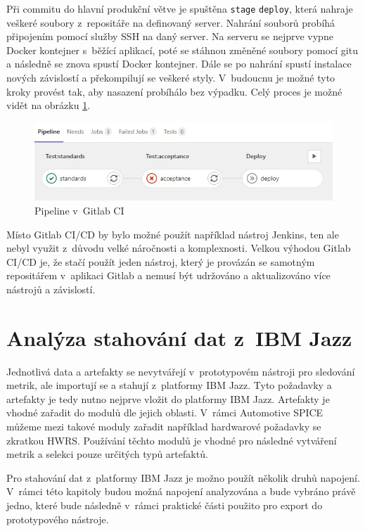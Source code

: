 \documentclass[czech,master]{diploma}
\begin{document}
Při commitu do hlavní produkční větve je spuštěna \texttt{stage} \texttt{deploy}, která nahraje veškeré soubory z~repositáře na definovaný server. Nahrání souborů probíhá připojením pomocí služby SSH na daný server. Na serveru se nejprve vypne Docker kontejner s~běžící aplikací, poté se stáhnou změněné soubory pomocí gitu a následně se znova spustí Docker kontejner. Dále se po nahrání spustí instalace nových závislostí a překompilují se veškeré styly. V~budoucnu je možné tyto kroky provést tak, aby nasazení probíhálo bez výpadku. Celý proces je možné vidět na obrázku \ref{fig:gitlab_ci}.

\begin{figure}[!ht]
    \centering
    \includegraphics[width=1\textwidth]{Diplomka/Figures/gitlab_ci.jpg}
    \caption{Pipeline v~Gitlab CI}
    \label{fig:gitlab_ci}
\end{figure}

Místo Gitlab CI/CD by bylo možné použít například nástroj Jenkins, ten ale nebyl využit z~důvodu velké náročnosti a komplexnosti. Velkou výhodou Gitlab CI/CD je, že stačí použít jeden nástroj, který je provázán se samotným repositářem v~aplikaci Gitlab a nemusí být udržováno a aktualizováno více nástrojů a závislostí.

\section{Analýza stahování dat z~IBM Jazz}
\label{sec:ibm_export}

Jednotlivá data a artefakty se nevytvářejí v~prototypovém nástroji pro sledování metrik, ale importují se a stahují z~platformy IBM Jazz. Tyto požadavky a artefakty je tedy nutno nejprve vložit do platformy IBM Jazz. Artefakty je vhodné zařadit do modulů dle jejich oblasti. V~rámci Automotive SPICE můžeme mezi takové moduly zařadit například hardwarové požadavky se zkratkou HWRS. Používání těchto modulů je vhodné pro následné vytváření metrik a selekci pouze určitých typů artefaktů.

Pro stahování dat z~platformy IBM Jazz je možno použít několik druhů napojení. V~rámci této kapitoly budou možná napojení analyzována a bude vybráno právě jedno, které bude následně v~rámci praktické části použito pro export do prototypového nástroje.
\end{document}
